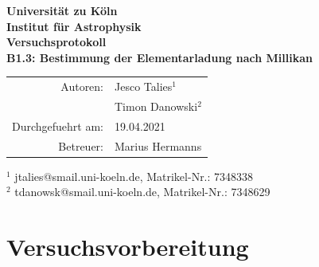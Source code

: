 \documentclass{scrartcl}
\begin{document}
    \thispagestyle{empty}
    \vspace*{\fill}
    \begin{center}
        \Huge
        \textbf{Universität zu Köln}\\
        \LARGE
        \textbf{Institut für Astrophysik}\\ 
        \vspace{2cm}
        \textbf{Versuchsprotokoll}\\
        \vspace{0.5cm}
        \large
        \textbf{B1.3: Bestimmung der Elementarladung nach Millikan}\\
        \normalsize
        \vspace{2cm}
        \begin{tabular}{r l}
            Autoren: 	& Jesco Talies$^1$\\
                        & Timon Danowski$^2$\\
            Durchgefuehrt am:	& 19.04.2021\\
            Betreuer:	& Marius Hermanns
        \end{tabular}
    \end{center}
    \vfill\footnotesize
    $^1$ jtalies@smail.uni-koeln.de, Matrikel-Nr.: 7348338\\
    $^2$ tdanowsk@smail.uni-koeln.de, Matrikel-Nr.: 7348629\\
    \normalsize

    \newpage 
    \thispagestyle{empty}
    \tableofcontents
    \clearpage 
\setcounter{page}{1} 

\section{Versuchsvorbereitung}
\end{document}
